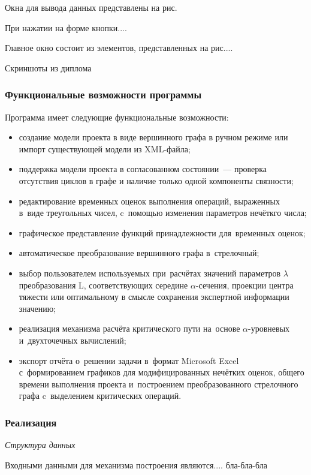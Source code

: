 Окна для вывода данных представлены на рис.

При нажатии на форме кнопки....

Главное окно состоит из элементов, представленных на рис....

Скриншоты из диплома

\subsubsection*{Функциональные возможности программы}
Программа имеет следующие функциональные возможности:
\begin{itemize}
  \item создание модели проекта в виде вершинного графа в ручном режиме или импорт существующей модели из XML-файла;
  \item поддержка модели проекта в согласованном состоянии~--- проверка отсутствия циклов в графе и наличие только одной компоненты связности;
  \item редактирование временных оценок выполнения операций, выраженных в~виде треугольных чисел, c~помощью изменения параметров нечёткго числа;
  \item графическое представление функций принадлежности для~временных оценок;
  \item автоматическое преобразование вершинного графа в~стрелочный;
  \item выбор пользователем используемых при~расчётах значений параметров $\lambda$ преобразования L, соответствующих середине $\alpha$-сечения, проекции центра тяжести или оптимальному в смысле сохранения экспертной информации значению;
  \item реализация механизма расчёта критического пути на~основе $\alpha$-уровневых и~двухточечных вычислений;
  \item экспорт отчёта о~решении задачи в~формат Microsoft Excel с~формированием графиков для модифицированных нечётких оценок, общего времени выполнения проекта и~построением преобразованного стрелочного графа c~выделением критических операций.
\end{itemize}

\subsubsection*{Реализация}

\textit{Структура данных}

Входными данными для механизма построения являются.... бла-бла-бла

